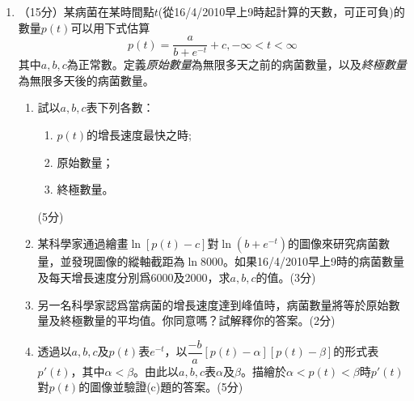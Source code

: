 \documentclass[12pt]{article}
\begin{document}
\begin{enumerate}
        \hrulefill

        \hrulefill

        \hrulefill

        \hrulefill

        \hrulefill

        \hrulefill

        \hrulefill

        \hrulefill

        \hrulefill

        \hrulefill

        \hrulefill

        \hrulefill

        \hrulefill

        \hrulefill

        \hrulefill

        \hrulefill

        \hrulefill

        \hrulefill

        \hrulefill

        \hrulefill

        \item （15分）某病菌在某時間點$t$(從16/4/2010早上9時起計算的天數，可正可負)的數量$p(t)$可以用下式估算$$p(t)=\frac{a}{b+e^{-t}}+c, -\infty<t<\infty$$其中$a,b,c$為正常數。定義\textit{原始數量}為無限多天之前的病菌數量，以及\textit{終極數量}為無限多天後的病菌數量。\begin{enumerate}
            \item 試以$a,b,c$表下列各數：\begin{enumerate}
                \item $p(t)$的增長速度最快之時;
                \item 原始數量；
                \item 終極數量。
            \end{enumerate}\hfill(5分)
            \item 某科學家通過繪畫$\ln[p(t)-c]$對$\ln(b+e^{-t})$的圖像來研究病菌數量，並發現圖像的縱軸截距為$\ln 8000$。如果16/4/2010早上9時的病菌數量及每天增長速度分別爲6000及2000，求$a,b,c$的值。\hfill(3分)
            \item 另一名科學家認爲當病菌的增長速度達到峰值時，病菌數量將等於原始數量及終極數量的平均值。你同意嗎？試解釋你的答案。\hfill(2分)
            \item 透過以$a,b,c$及$p(t)$表$e^{-t}$，以$\dfrac{-b}{a}[p(t)-\alpha][p(t)-\beta]$的形式表$p'(t)$，其中$\alpha<\beta$。由此以$a,b,c$表$\alpha$及$\beta$。描繪於$\alpha<p(t)<\beta$時$p'(t)$對$p(t)$的圖像並驗證(c)題的答案。\hfill(5分)
        \end{enumerate}


\end{enumerate}
\end{document}
